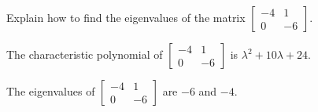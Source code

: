 
\begin{exerciseStatement}


Explain how to find the eigenvalues of the matrix \( \left[\begin{array}{cc}
-4 & 1 \\
0 & -6
\end{array}\right] \).


\end{exerciseStatement}
    
\begin{exerciseAnswer} 


The characteristic polynomial of \( \left[\begin{array}{cc}
-4 & 1 \\
0 & -6
\end{array}\right] \) is \( \lambda^{2} + 10 \lambda + 24 \).



The eigenvalues of \( \left[\begin{array}{cc}
-4 & 1 \\
0 & -6
\end{array}\right] \) are \( -6 \) and \( -4 \).


\end{exerciseAnswer}
    
